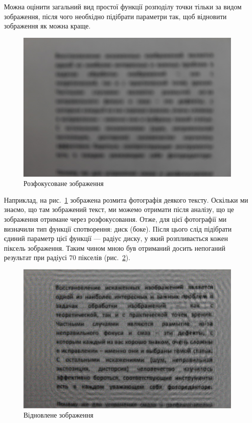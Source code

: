 \documentclass{diploma}
\begin{document}
    Можна оцінити загальний вид простої функції розподілу точки тільки за
    видом зображення, після чого необхідно підібрати параметри так, щоб
    відновити зображення як можна краще.

    \begin{figure}[ht]
      \centering
      \includegraphics[width=0.8\linewidth]{text-blurred.jpg}
      \caption{Розфокусоване зображення}
      \label{fig:text:blurred}
    \end{figure}

    Наприклад, на рис.~\ref{fig:text:blurred} зображена розмита фотографія
    деякого тексту.
    Оскільки ми знаємо, що там зображений текст, ми можемо отримати після
    аналізу, що це зображення отримане через розфокусовання.
    Отже, для цієї фотографії ми визначили тип функції спотворення: диск
    (боке).
    Після цього слід підібрати єдиний параметр цієї функції --- радіус диску,
    у який розпливається кожен піксель зображення.
    Таким чином мною був отриманий досить непоганий результат при радіусі $70$
    пікселів (рис.~\ref{fig:text:unblurred}).

    \begin{figure}[ht]
      \centering
      \includegraphics[width=0.8\linewidth]{text-unblurred.jpg}
      \caption{Відновлене зображення}
      \label{fig:text:unblurred}
    \end{figure}
\end{document}
